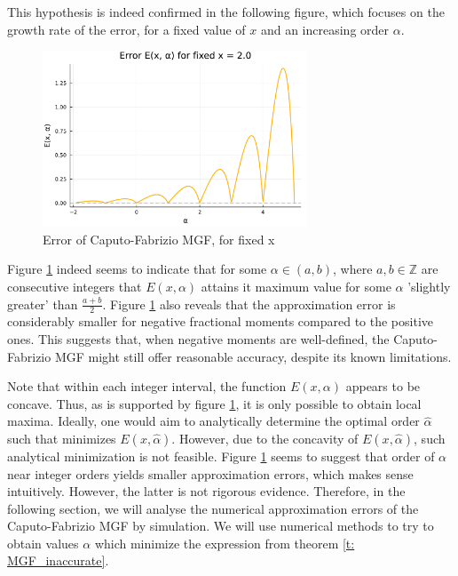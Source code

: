 This hypothesis is indeed confirmed in the following figure, which focuses on the growth rate of the error, for a fixed value of \(x\) and an increasing order \(\alpha\).

\begin{figure}[H]
    \centering
    \includegraphics[width=0.7\textwidth]{figures/error_plot_fixed_x.pdf}
    \caption{Error of Caputo-Fabrizio MGF, for fixed x}
    \label{fig:error_MGF_fixed_x}
\end{figure}
Figure \ref{fig:error_MGF_fixed_x} indeed seems to indicate that for some \(\alpha \in (a, b)\), where \(a, b \in \mathbb{Z}\) are consecutive integers that \(E(x, \alpha)\) attains it maximum value for some \(\alpha\) 'slightly greater' than \(\frac{a + b}{2}\). Figure \ref{fig:error_MGF_fixed_x} also reveals that the approximation error is considerably smaller for negative fractional moments compared to the positive ones. This suggests that, when negative moments are well-defined, the Caputo-Fabrizio MGF might still offer reasonable accuracy, despite its known limitations.

Note that within each integer interval, the function \(E(x, \alpha)\) appears to be concave. Thus, as is supported by figure \ref{fig:error_MGF_fixed_x}, it is only possible to obtain local maxima. Ideally, one would aim to analytically determine the optimal order \(\hat{\alpha}\) such that minimizes \(E(x, \hat{\alpha})\). However, due to the concavity of \(E(x, \hat{\alpha})\), such analytical minimization is not feasible. Figure \ref{fig:error_MGF_fixed_x} seems to suggest that order of \(\alpha\) near integer orders yields smaller approximation errors, which makes sense intuitively. However, the latter is not rigorous evidence. Therefore, in the following section, we will analyse the numerical approximation errors of the Caputo-Fabrizio MGF by simulation. We will use numerical methods to try to obtain values \(\alpha\) which minimize the expression from theorem \ref{t: MGF_inaccurate}.

